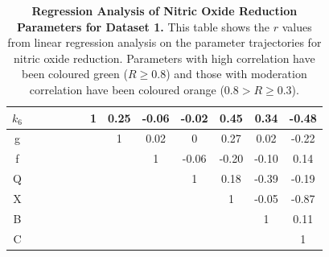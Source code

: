 \begin{table}[p]
{\begin{minipage}{24.4cm}
\begin{tabular}{|c|c|c|c|c|c|c|c|c|c|c|c|c|}
    \hline
    \cellcolor{dark-gray}$k_6$ & \cellcolor{light-gray} & \cellcolor{light-gray} & \cellcolor{light-gray} & \cellcolor{light-gray} & \cellcolor{light-gray} & \cellcolor{light-gray}1 & 0.25 & -0.06 & -0.02 & \cellcolor{orange}0.45 & \cellcolor{orange}0.34 & \cellcolor{orange}-0.48 \\
    \hline
    \cellcolor{dark-gray}g & \cellcolor{light-gray} & \cellcolor{light-gray} & \cellcolor{light-gray} & \cellcolor{light-gray} & \cellcolor{light-gray} & \cellcolor{light-gray} & \cellcolor{light-gray}1 & 0.02 & 0 & 0.27 & 0.02 & -0.22 \\
    \hline
    \cellcolor{dark-gray}f & \cellcolor{light-gray} & \cellcolor{light-gray} & \cellcolor{light-gray} & \cellcolor{light-gray} & \cellcolor{light-gray} & \cellcolor{light-gray} & \cellcolor{light-gray} & \cellcolor{light-gray}1 & -0.06 & -0.20 & -0.10 & 0.14 \\
    \hline
    \cellcolor{dark-gray}Q & \cellcolor{light-gray} & \cellcolor{light-gray} & \cellcolor{light-gray} & \cellcolor{light-gray} & \cellcolor{light-gray} & \cellcolor{light-gray} & \cellcolor{light-gray} & \cellcolor{light-gray} & \cellcolor{light-gray}1 & 0.18 & \cellcolor{orange}-0.39 & -0.19\\
    \hline
    \cellcolor{dark-gray}X & \cellcolor{light-gray} & \cellcolor{light-gray} & \cellcolor{light-gray} & \cellcolor{light-gray} & \cellcolor{light-gray} & \cellcolor{light-gray} & \cellcolor{light-gray} & \cellcolor{light-gray} & \cellcolor{light-gray} & \cellcolor{light-gray}1 & -0.05 & \cellcolor{green}-0.87 \\
    \hline
    \cellcolor{dark-gray}B & \cellcolor{light-gray} & \cellcolor{light-gray} & \cellcolor{light-gray} & \cellcolor{light-gray} & \cellcolor{light-gray} & \cellcolor{light-gray} & \cellcolor{light-gray} & \cellcolor{light-gray} & \cellcolor{light-gray} & \cellcolor{light-gray} & \cellcolor{light-gray}1 & 0.11 \\
    \hline
    \cellcolor{dark-gray}C & \cellcolor{light-gray} & \cellcolor{light-gray} & \cellcolor{light-gray} & \cellcolor{light-gray} & \cellcolor{light-gray} & \cellcolor{light-gray} & \cellcolor{light-gray} & \cellcolor{light-gray} & \cellcolor{light-gray} & \cellcolor{light-gray} & \cellcolor{light-gray} & \cellcolor{light-gray}1 \\
    \hline
  \end{tabular}
  \caption[Regression Analysis of Nitric Oxide Reduction Parameters]{{\bf Regression Analysis of Nitric Oxide Reduction Parameters for Dataset 1.} This table shows the $r$ values from linear regression analysis on the parameter trajectories for nitric oxide reduction. Parameters with high correlation have been coloured green ($R\geq0.8$) and those with moderation correlation have been coloured orange ($0.8>R\geq0.3$).
  \label{tab:noregress1}}
  \end{minipage}
  }
\end{table}
\afterpage{\clearpage}

